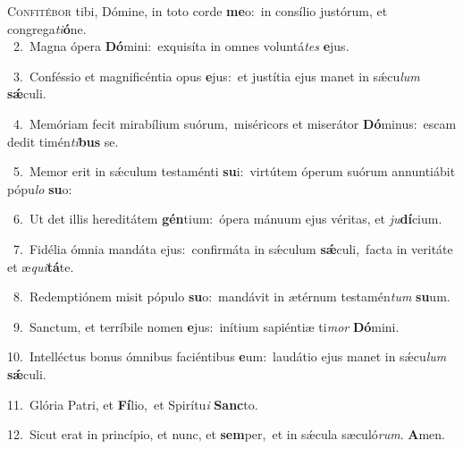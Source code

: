 \lettrine{\initial\textcolor{\initialcolor}{C}}{onfitébor} tibi, Dómine, in toto corde \textbf{me}\-o:~\star in consílio justórum, et congrega\-\textit{ti}\-\textbf{ó}ne.\\
{\numbfont\textcolor{\numbcolor}{~2.}}~Magna ópera \textbf{Dó}\-mini:~\star exquisíta in omnes voluntá\textit{tes} \textbf{e}\-jus.\par
{\numbfont\textcolor{\numbcolor}{~3.}}~Conféssio et magnificéntia opus \textbf{e}\-jus:~\star et justítia ejus manet in sǽcu\textit{lum} \textbf{sǽ}\-culi.\par
{\numbfont\textcolor{\numbcolor}{~4.}}~Memóriam fecit mirabílium suórum,~\dagger miséricors et miserátor \textbf{Dó}\-minus:~\star escam dedit timén\-\textit{ti}\-\textbf{bus} se.\par
{\numbfont\textcolor{\numbcolor}{~5.}}~Memor erit in sǽculum testaménti \textbf{su}\-i:~\star virtútem óperum suórum annuntiábit pópu\textit{lo} \textbf{su}\-o:\par
{\numbfont\textcolor{\numbcolor}{~6.}}~Ut det illis hereditátem \textbf{gén}\-tium:~\star ópera mánuum ejus véritas, et \textit{ju}\-\textbf{dí}cium.\par
{\numbfont\textcolor{\numbcolor}{~7.}}~Fidélia ómnia mandáta ejus:~\dagger confirmáta in sǽculum \textbf{sǽ}\-culi,~\star facta in veritáte et æ\-\textit{qui}\-\textbf{tá}te.\par
{\numbfont\textcolor{\numbcolor}{~8.}}~Redemptiónem misit pópulo \textbf{su}\-o:~\star mandávit in ætérnum testamén\textit{tum} \textbf{su}\-um.\par
{\numbfont\textcolor{\numbcolor}{~9.}}~Sanctum, et terríbile nomen \textbf{e}\-jus:~\star inítium sapiéntiæ ti\textit{mor} \textbf{Dó}\-mini.\par
{\numbfont\textcolor{\numbcolor}{10.}}~Intelléctus bonus ómnibus faciéntibus \textbf{e}\-um:~\star laudátio ejus manet in sǽcu\textit{lum} \textbf{sǽ}\-culi.\par
{\numbfont\textcolor{\numbcolor}{11.}}~Glória Patri, et \textbf{Fí}\-lio,~\star et Spirítu\textit{i} \textbf{Sanc}\-to.\par
{\numbfont\textcolor{\numbcolor}{12.}}~Sicut erat in princípio, et nunc, et \textbf{sem}\-per,~\star et in sǽcula sæculó\-\textit{rum}\-. \textbf{A}\-men.\par
